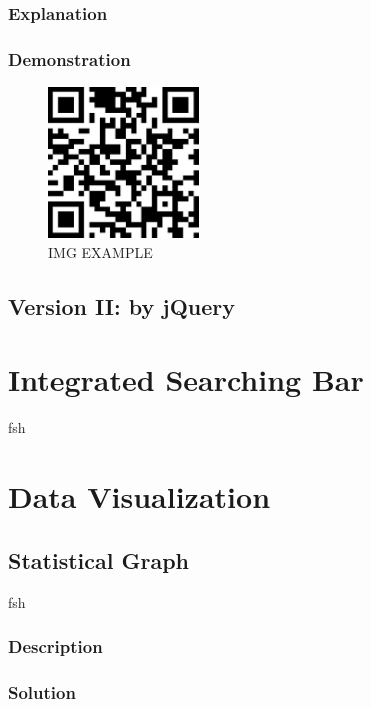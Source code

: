 \documentclass{book}
\begin{document}
\subsection{Explanation}

\subsection{Demonstration}

\begin{figure}[H]
\centering
\includegraphics[height=4.0cm,width=4.0cm]{img/dsw_1.jpg}
\caption{IMG EXAMPLE}
\end{figure}


\section{Version II: by jQuery}



\chapter {Integrated Searching Bar}

fsh


\chapter {Data Visualization}


\section {Statistical Graph}

fsh

\subsection{Description}

\subsection{Solution}
\end{document}
